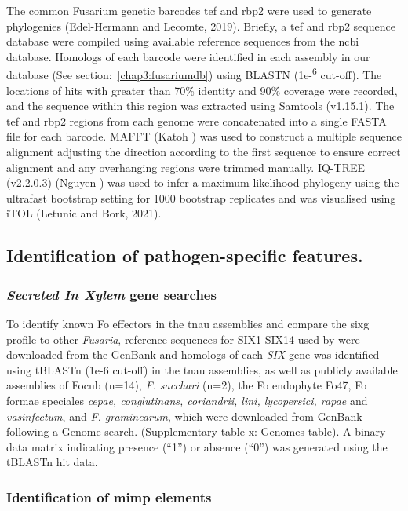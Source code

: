 The common Fusarium genetic barcodes \ac{tef} and \ac{rbp2} were used to generate phylogenies (Edel-Hermann and Lecomte, 2019). Briefly, a \ac{tef} and \ac{rbp2} sequence database were compiled using available reference sequences from the \ac{ncbi} database. Homologs of each barcode were identified in each assembly in our database (See section:~\ref{chap3:fusariumdb}) using BLASTN (1e-\textsuperscript{6} cut-off). The locations of hits with greater than 70\% identity and 90\% coverage were recorded, and the sequence within this region was extracted using Samtools (v1.15.1). The \ac{tef} and \ac{rbp2} regions from each genome were concatenated into a single FASTA file for each barcode. MAFFT (Katoh ) was used to construct a multiple sequence alignment adjusting the direction according to the first sequence to ensure correct alignment and any overhanging regions were trimmed manually. IQ-TREE (v2.2.0.3) (Nguyen ) was used to infer a maximum-likelihood phylogeny using the ultrafast bootstrap setting for 1000 bootstrap replicates and was visualised using iTOL (Letunic and Bork, 2021). 

\subsection{Identification of pathogen-specific features.}

\subsubsection{\textit{Secreted In Xylem} gene searches}

To identify known \acs{Fo} effectors in the \ac{tnau} assemblies and compare the \ac{sixg} profile to other \textit{Fusaria}, reference sequences for SIX1-SIX14 used by \textcite{Czislowski2018} were downloaded from the GenBank and homologs of each \textit{SIX} gene was identified using tBLASTn (1e-6 cut-off) in the \ac{tnau} assemblies, as well as publicly available assemblies of \ac{Focub} (n=14), \textit{F. sacchari} (n=2), the \ac{Fo} endophyte Fo47, \ac{Fo} formae speciales \textit{cepae, conglutinans, coriandrii, lini, lycopersici,  rapae} and \textit{vasinfectum}, and \textit{F. graminearum}, which were downloaded from \href{https://www.ncbi.nlm.nih.gov/data-hub/genome/}{GenBank} following a Genome search. (Supplementary table x: Genomes table). A binary data matrix indicating presence (“1”) or absence (“0”) was generated using the tBLASTn hit data.

\subsubsection{Identification of \acl{mimp} elements}

